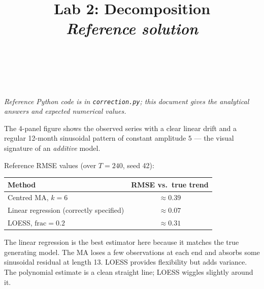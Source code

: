 \documentclass[a4paper,11pt]{article}
\title{Lab 2: Decomposition\\\large \emph{Reference solution}}
\author{\auteurNom\\\auteurEmail\\\auteurInstitution}
\date{\anneeUniversitaire}
\begin{document}
\maketitle

\noindent\emph{Reference Python code is in \texttt{correction.py}; this
document gives the analytical answers and expected numerical values.}

\setcounter{excounter}{0}
\begin{exercise}\end{exercise}

\begin{solution}
The 4-panel figure shows the observed series with a clear linear drift
and a regular 12-month sinusoidal pattern of constant amplitude $5$ —
the visual signature of an \emph{additive} model.
\end{solution}

\begin{exercise}\end{exercise}

\begin{solution}
Reference RMSE values (over $T = 240$, seed 42):
\begin{center}
\begin{tabular}{lc}
\toprule
\textbf{Method}                                  & \textbf{RMSE vs.\ true trend} \\
\midrule
Centred MA, $k = 6$                              & $\approx 0.39$ \\
Linear regression (correctly specified)          & $\approx 0.07$ \\
LOESS, $\mathrm{frac} = 0.2$                     & $\approx 0.31$ \\
\bottomrule
\end{tabular}
\end{center}
The linear regression is the best estimator here because it matches
the true generating model. The MA loses a few observations at each
end and absorbs some sinusoidal residual at length 13. LOESS provides
flexibility but adds variance. The polynomial estimate is a clean
straight line; LOESS wiggles slightly around it.
\end{solution}

\begin{exercise}\end{exercise}
\end{document}
